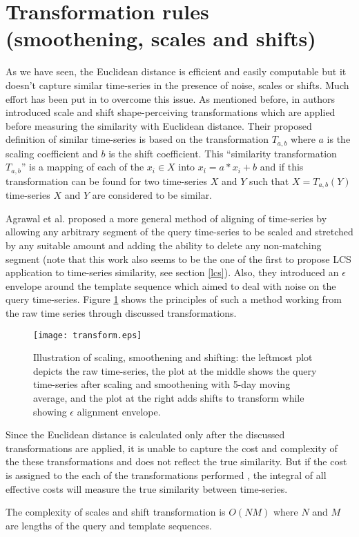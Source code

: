 \section{Transformation rules (smoothening, scales and shifts)} \label{scales_and_shifts}
As we have seen, the Euclidean distance is efficient and easily computable but it doesn't capture similar time-series in the presence of noise, scales or shifts. Much effort has been put in to overcome this issue. As mentioned before, in \cite{citeulike:3815880} authors introduced scale and shift shape-perceiving transformations which are applied before measuring the similarity with Euclidean distance. Their proposed definition of similar time-series is based on the transformation $T_{a,b}$ where $a$ is the scaling coefficient and $b$ is the shift coefficient. This ``similarity transformation $T_{a,b}$'' is a mapping of each of the $x_{i} \in X$ into $x_{i}\acute{} = a*x_{i}+b$ and if this transformation can be found for two time-series $X$ and $Y$ such that $X=T_{a,b}(Y)$ time-series $X$ and $Y$ are considered to be similar.

Agrawal et al. \cite{citeulike:3816327} proposed a more general method of aligning of time-series by allowing any arbitrary segment of the query time-series to be scaled and stretched by any suitable amount and adding the ability to delete any non-matching segment (note that this work also seems to be the one of the first to propose LCS application to time-series similarity, see section \ref{lcs}). Also, they introduced an $\epsilon$ envelope around the template sequence which aimed to deal with noise on the query time-series. Figure  \ref{fig:transform} shows the principles of such a method working from the raw time series through discussed transformations.

\begin{figure}[tbp]
   \centering
   \texttt{[image: transform.eps]}
   \caption{Illustration of scaling, smoothening and shifting: the leftmost plot depicts the raw time-series, the plot at the middle shows the query time-series after scaling and smoothening with 5-day moving average, and the plot at the right adds shifts to transform while showing $\epsilon$ alignment envelope.}
   \label{fig:transform}
\end{figure} 

Since the Euclidean distance is calculated only after the discussed transformations are applied, it is unable to capture the cost and complexity of the these transformations and does not reflect the true similarity. But if the cost is assigned to the each of the transformations performed \cite{citeulike:3731711}, the integral of all effective costs will measure the true similarity between time-series.

The complexity of scales and shift transformation is $O(NM)$ where $N$ and $M$ are lengths of the query and template sequences.

